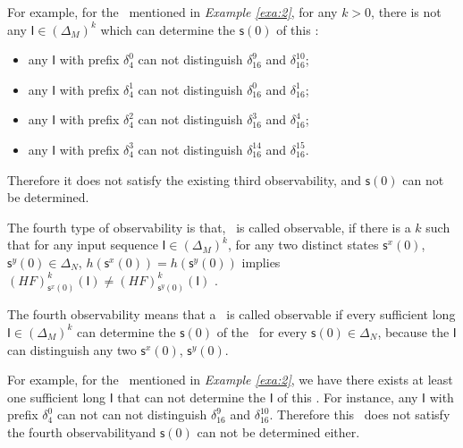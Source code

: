 \begin{example}
For example, for the \BCN\ mentioned in {\em Example \ref{exa:2}}, for any $k>0$, there is not any $\mathsf{I}\in(\Delta_M)^k$ which can determine the $\mathsf{s}(0)$ of this \BCN:
\begin{itemize}
  \item any $\mathsf{I}$ with prefix $\delta_{4}^0$ can not distinguish $\delta_{16}^9$ and $\delta_{16}^{10}$;
  \item any $\mathsf{I}$ with prefix $\delta_{4}^1$ can not distinguish $\delta_{16}^0$ and $\delta_{16}^{1}$;
  \item any $\mathsf{I}$ with prefix $\delta_{4}^2$ can not distinguish $\delta_{16}^3$ and $\delta_{16}^{4}$;
  \item any $\mathsf{I}$ with prefix $\delta_{4}^3$ can not distinguish $\delta_{16}^{14}$ and $\delta_{16}^{15}$.
\end{itemize} 
Therefore it does not satisfy the existing third observability, and $\mathsf{s}(0)$ can not be determined. 
\label{exa:6}
\end{example}  
\begin{definition}
	The fourth type of observability is that, \BCN\ is called observable, if there is a $k$ such that for any input sequence $\mathsf{I}\in(\Delta_M)^{k}$, for any two distinct states $\mathsf{s}^{x}(0)$, $\mathsf{s}^{y}(0) \in \Delta_N$, $h(\mathsf{s}^{x}(0))=h(\mathsf{s}^{y}(0))$ implies $(HF)^{k}_{\mathsf{s}^{x}(0)}(\mathsf{I})\neq (HF)^{k}_{\mathsf{s}^{y}(0)}(\mathsf{I})$ \cite{Fornasini2013Observability}.
\end{definition}

The fourth observability means that a \BCN\ is called observable if every sufficient long $\mathsf{I}\in(\Delta_M)^{k}$ can determine the $\mathsf{s}(0)$ of the \BCN\ for every $\mathsf{s}(0)\in\Delta_N$, because the $\mathsf{I}$ can distinguish any two $\mathsf{s}^{x}(0)$, $\mathsf{s}^{y}(0)$.%
\begin{example}
For example, for the \BCN\ mentioned in {\em Example \ref{exa:2}}, we have there exists at least one sufficient long $\mathsf{I}$ that can not determine the $\mathsf{I}$ of this \BCN. For instance, any $\mathsf{I}$ with prefix $\delta_{4}^0$ can not can not distinguish $\delta_{16}^9$ and $\delta_{16}^{10}$. 
Therefore this \BCN\ does not satisfy the fourth observabilityand $\mathsf{s}(0)$ can not be determined either. 
\label{exa:7}
\end{example}  

